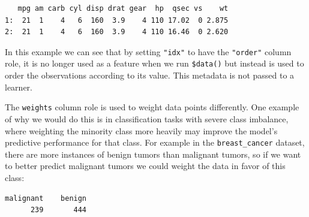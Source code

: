 \begin{verbatim}
   mpg am carb cyl disp drat gear  hp  qsec vs    wt
1:  21  1    4   6  160  3.9    4 110 17.02  0 2.875
2:  21  1    4   6  160  3.9    4 110 16.46  0 2.620
\end{verbatim}

In this example we can see that by setting \texttt{"idx"} to have the
\texttt{"order"} column role, it is no longer used as a feature when we
run \texttt{\$data()} but instead is used to order the observations
according to its value. This metadata is not passed to a learner.

The \texttt{weights} column role is used to weight data points
differently. One example of why we would do this is in classification
tasks with severe class imbalance, where weighting the minority class
more heavily may improve the model's predictive performance for that
class. For example in the \texttt{breast\_cancer} dataset, there are
more instances of benign tumors than malignant tumors, so if we want to
better predict malignant tumors we could weight the data in favor of
this class:

\begin{Shaded}
\begin{Highlighting}[]
\OtherTok{=} \NormalTok{(}\NormalTok{)}
\SpecialCharTok{$}\NormalTok{()}\SpecialCharTok{$}
\end{Highlighting}
\end{Shaded}

\begin{verbatim}
malignant    benign 
      239       444 
\end{verbatim}

